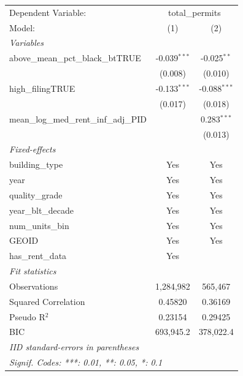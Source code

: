 \begingroup
\centering
\begin{tabular}{lcc}
   \tabularnewline \midrule \midrule
   Dependent Variable: & \multicolumn{2}{c}{total\_permits}\\
   Model:                                    & (1)            & (2)\\  
   \midrule
   \emph{Variables}\\
   above\_mean\_pct\_black\_btTRUE           & -0.039$^{***}$ & -0.025$^{**}$\\   
                                             & (0.008)        & (0.010)\\   
   high\_filingTRUE                          & -0.133$^{***}$ & -0.088$^{***}$\\   
                                             & (0.017)        & (0.018)\\   
   mean\_log\_med\_rent\_inf\_adj\_PID       &                & 0.283$^{***}$\\   
                                             &                & (0.013)\\   
   \midrule
   \emph{Fixed-effects}\\
   building\_type                            & Yes            & Yes\\  
   year                                      & Yes            & Yes\\  
   quality\_grade                            & Yes            & Yes\\  
   year\_blt\_decade                         & Yes            & Yes\\  
   num\_units\_bin                           & Yes            & Yes\\  
   GEOID                                     & Yes            & Yes\\  
   has\_rent\_data                           & Yes            & \\  
   \midrule
   \emph{Fit statistics}\\
   Observations                              & 1,284,982      & 565,467\\  
   Squared Correlation                       & 0.45820        & 0.36169\\  
   Pseudo R$^2$                              & 0.23154        & 0.29425\\  
   BIC                                       & 693,945.2      & 378,022.4\\  
   \midrule \midrule
   \multicolumn{3}{l}{\emph{IID standard-errors in parentheses}}\\
   \multicolumn{3}{l}{\emph{Signif. Codes: ***: 0.01, **: 0.05, *: 0.1}}\\
\end{tabular}
\par\endgroup
